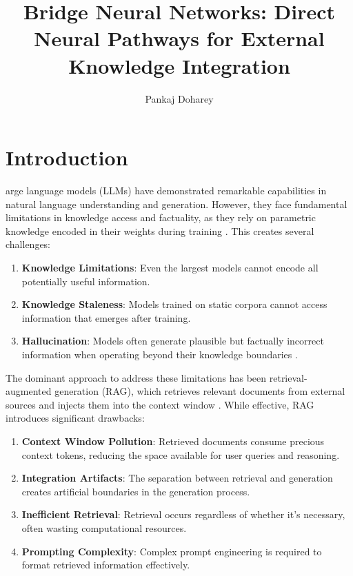 \documentclass[9pt,a4paper,twocolumn,twoside]{tau-class/tau}
\title{Bridge Neural Networks: Direct Neural Pathways for External Knowledge Integration}
\author[a,1]{Pankaj Doharey}
\affil[a]{ZenDiffusion.art Research}
\begin{document}
		
    \maketitle 
    \thispagestyle{firststyle} 
    \tauabstract 
    

\section{Introduction}

    arge language models (LLMs) have demonstrated remarkable capabilities in natural language understanding and generation. However, they face fundamental limitations in knowledge access and factuality, as they rely on parametric knowledge encoded in their weights during training \cite{brown2020language, petroni2019language}. This creates several challenges:

    \begin{enumerate}
        \item \textbf{Knowledge Limitations}: Even the largest models cannot encode all potentially useful information.
        \item \textbf{Knowledge Staleness}: Models trained on static corpora cannot access information that emerges after training.
        \item \textbf{Hallucination}: Models often generate plausible but factually incorrect information when operating beyond their knowledge boundaries \cite{maynez2020faithfulness}.
    \end{enumerate}

    The dominant approach to address these limitations has been retrieval-augmented generation (RAG), which retrieves relevant documents from external sources and injects them into the context window \cite{guu2020realm, lewis2020retrieval}. While effective, RAG introduces significant drawbacks:

    \begin{enumerate}
        \item \textbf{Context Window Pollution}: Retrieved documents consume precious context tokens, reducing the space available for user queries and reasoning.
        \item \textbf{Integration Artifacts}: The separation between retrieval and generation creates artificial boundaries in the generation process.
        \item \textbf{Inefficient Retrieval}: Retrieval occurs regardless of whether it's necessary, often wasting computational resources.
        \item \textbf{Prompting Complexity}: Complex prompt engineering is required to format retrieved information effectively.
    \end{enumerate}
\end{document}
